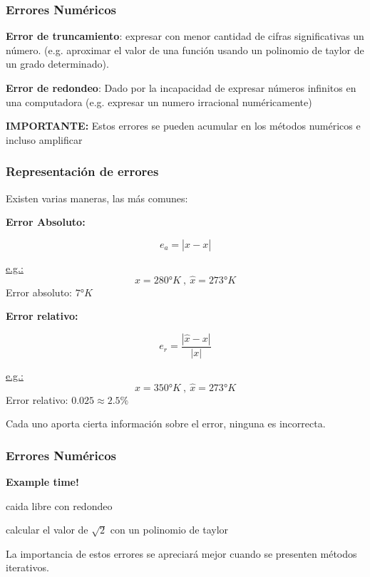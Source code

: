 \documentclass[xcolor=svgnames]{beamer} %
\theoremstyle{plain}
\renewcommand{\textbf}[1]{{\bfseries\textcolor{redUnq2}{#1}}}
\theoremstyle{definition}
\begin{document}
\begin{frame}
\frametitle{Errores Numéricos}
\textbf{Error de truncamiento}: expresar con menor cantidad de cifras significativas un número. (e.g. aproximar el valor de una función usando un polinomio de taylor de un grado determinado).
\vspace{10pt}


\textbf{Error de redondeo}: Dado por la incapacidad de expresar números infinitos en una computadora (e.g. expresar un numero irracional numéricamente)


\vspace{10pt}
\pause

\begin{tcolorbox}
\textbf{IMPORTANTE:}
Estos errores se pueden acumular en los métodos numéricos e incluso amplificar
\end{tcolorbox}

\end{frame}



\begin{frame}
\frametitle{Representación de errores}
Existen varias maneras, las más comunes:

\begin{minipage}{.45\linewidth}
  \textbf{Error Absoluto:}

  $$ e_a = | \hat x - x |$$
  \vspace{3pt}
  
  \underline{e.g.:}
  $$x = 280 \si{\degree}K\ ,\ \hat x = 273 \si{\degree}K$$
	Error absoluto:
	$ 7 \si{\degree}K$
\end{minipage} \vline \hspace{10pt}
\begin{minipage}{.45\linewidth}
	\vspace{10pt}
  \textbf{Error relativo:}

  $$ e_r = \frac{| \hat x - x |}{|x|}$$

  \underline{e.g.:}
  $$x = 350 \si{\degree}K\ ,\ \hat x = 273 \si{\degree}K$$
	Error relativo:
	$ 0.025 \approx 2.5\%$
\end{minipage}\vspace{10pt}


Cada uno aporta cierta información sobre el error, ninguna es incorrecta.


\end{frame}



\begin{frame}
\frametitle{Errores Numéricos}

\textbf{Example time!}


{\color{red} caida libre con redondeo }\vspace{10pt}


{\color{red} calcular el valor de $\sqrt{2}$ con un polinomio de taylor}\vspace{10pt}

La importancia de estos errores se apreciará mejor cuando se presenten métodos iterativos.
\end{frame}
\end{document}
